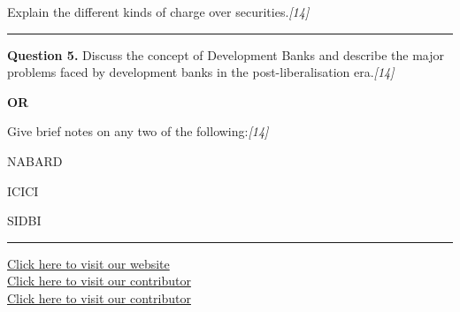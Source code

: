 \documentclass[11pt,a4paper]{article}
\newcommand{\pts}[1]{\hfill   \textit{[#1]}}
\begin{document}
Explain the different kinds of charge over securities.\pts{14}

\medskip\rule{\linewidth}{0.2pt}




\noindent   \textbf{Question 5.}
Discuss the concept of Development Banks and describe the major problems faced by development banks in the post-liberalisation era.\pts{14}

\centerline{   \textbf{OR}}

Give brief notes on any two of the following:\pts{14}

\begin{parts}
  \item NABARD
  \item ICICI
  \item SIDBI
\end{parts}

\vfill
\rule{\linewidth}{0.4pt}

\begin{center}\small
\href{https://bhu-exam.vercel.app/}{Click here to visit our website}\\[4pt]
\href{https://me-aryan.vercel.app/}{Click here to visit our contributor}\\[4pt]
\href{https://quashan-me.vercel.app/}{Click here to visit our contributor}
\end{center}
\end{document}
